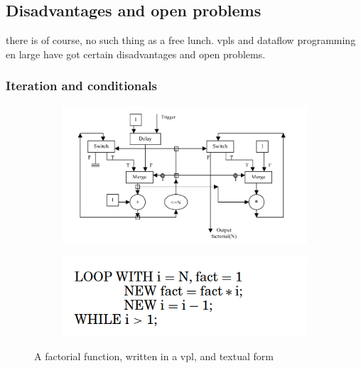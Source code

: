 \subsection{Disadvantages and open problems}
\label{sec:background:vpl:disadvantages}

there is of course, no such thing as a free lunch. 
\ac{vpl}s and dataflow programming en large have got certain disadvantages and open problems.




\subsubsection*{Iteration and conditionals}

\begin{figure}
  \centering
  \begin{subfigure}[b]{0.45\linewidth}
    \graphicspath{{../../assets/images/background/vpl/}}
    \centering
    \includegraphics[width=\linewidth]{iteration-vpl.png}
    \caption{}\label{fig:vpl-iteration:1}
  \end{subfigure}%
  \qquad %
  \begin{subfigure}[b]{0.45\linewidth}
    \graphicspath{{../../assets/images/background/vpl/}}
    \centering
    \includegraphics[width=\linewidth]{iteration-text.png}
    \caption{}\label{fig:vpl-iteration:2}
  \end{subfigure}%
  \caption[Comparrison of iteration]{A factorial function, written in a vpl, and textual form}%
  \label{fig:vpl-iteration}
  \end{figure}


